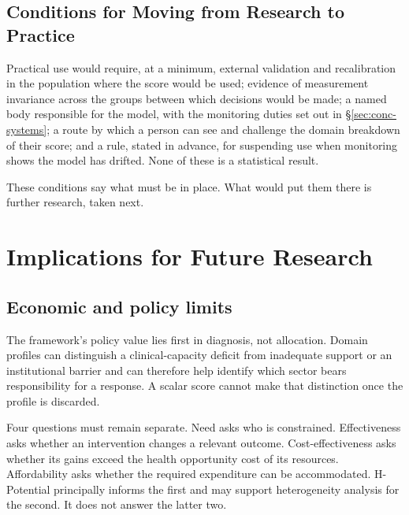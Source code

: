\subsection{Conditions for Moving from Research to Practice}

Practical use would require, at a minimum, external validation and
recalibration in the population where the score would be used; evidence of
measurement invariance across the groups between which decisions would be made;
a named body responsible for the model, with the monitoring duties set out in
\S\ref{sec:conc-systems}; a route by which a person can see and challenge the
domain breakdown of their score; and a rule, stated in advance, for suspending
use when monitoring shows the model has drifted. None of these is a statistical
result.

These conditions say what must be in place. What would put them there is
further research, taken next.

\section{Implications for Future Research}
\label{sec:future}

\subsection{Economic and policy limits}

The framework's policy value lies first in diagnosis, not allocation. Domain
profiles can distinguish a clinical-capacity deficit from inadequate support or
an institutional barrier and can therefore help identify which sector bears
responsibility for a response. A scalar score cannot make that distinction once
the profile is discarded.

Four questions must remain separate. Need asks who is constrained. Effectiveness
asks whether an intervention changes a relevant outcome. Cost-effectiveness asks
whether its gains exceed the health opportunity cost of its resources.
Affordability asks whether the required expenditure can be accommodated.
H-Potential principally informs the first and may support heterogeneity analysis
for the second. It does not answer the latter two.

